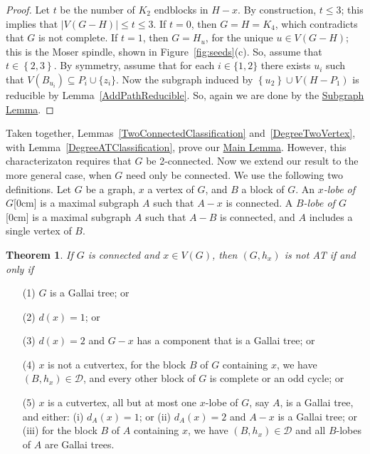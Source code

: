 \documentclass[12pt]{article}
\theoremstyle{plain}
\newtheorem{thm}{Theorem}[section]
\theoremstyle{definition}
\theoremstyle{remark}
\newcommand{\fancy}[1]{\mathcal{#1}}
\newcommand{\D}{\fancy{D}}
\newcommand{\set}[1]{\left\{ #1 \right\}}
\def\D{\fancy{D}}
\newcommand{\aside}[1]{\marginnote{\scriptsize{#1}}[0cm]}
\begin{document}
\begin{proof}
		Let $t$ be the number of $K_2$ endblocks in $H-x$.
		By construction, $t\le 3$; this implies that $|V(G - H)| \le t\le 3$.   
		If $t = 0$, then $G = H = K_4$, which contradicts that $G$ is not complete.  
		If $t=1$, then $G = H_u$, for the unique $u \in V(G-H)$; this is the Moser
		spindle, shown in Figure~\ref{fig:seeds}(c).  So, assume that $t \in
		\set{2,3}$.  By symmetry, assume that for each $i\in\{1,2\}$ there exists $u_i$
		such that $V(B_{u_i})\subseteq P_i\cup\{z_i\}$.  Now the subgraph induced by
		$\set{u_2}\cup V(H-P_1)$ is reducible by Lemma~\ref{AddPathReducible}. 
		So, again we are done by the \hyperlink{target:InducedSubgraph}{Subgraph Lemma}.  
	\end{proof}
	
	Taken together, Lemmas~\ref{TwoConnectedClassification}
	and~\ref{DegreeTwoVertex}, with
	Lemma~\ref{DegreeATClassification}, prove our \hyperlink{target:mainLemma}{Main Lemma}.
	However, this characterizaton requires that $G$ be 2-connected.
	Now we extend our result to the more general case, when $G$ need only be
	connected.  We use the following two definitions.  Let $G$ be a graph, $x$
	a vertex of $G$, and $B$ a block of $G$.  An \emph{$x$-lobe of
		$G$}\aside{$x$-lobe} is a maximal subgraph $A$ such that $A-x$ is connected.  A
	\emph{$B$-lobe of $G$}\aside{$B$-lobe} is a maximal subgraph $A$ such that
	$A-B$ is connected, and $A$ includes a single vertex of $B$.  
	
	\begin{thm}
		If $G$ is connected and $x \in V(G)$, then $(G, h_x)$ is not AT if and only if
		\label{thm:1connected}
	\end{thm}
	
	\begin{enumerate}
		\item[(1)] $G$ is a Gallai tree; or
		\item[(2)] $d(x) = 1$; or
		\item[(3)] $d(x) = 2$ and $G-x$ has a component that is a Gallai tree; or
		\item[(4)] $x$ is not a cutvertex, for the block $B$ of $G$ containing $x$,
		we have $(B,h_x) \in \D$, and every other block of $G$ is complete or
		an odd cycle; or
		\item[(5)]
		$x$ is a cutvertex, all but at most one $x$-lobe of $G$, say $A$, is a Gallai
		tree, and either:
		(i) $d_A(x) = 1$; or
		(ii) $d_A(x)=2$ and $A-x$ is a Gallai tree; or 
		(iii) for the block $B$ of $A$ containing $x$, 
		we have $(B,h_x)\in \D$ and all $B$-lobes of $A$ are Gallai trees. 
	\end{enumerate}
	
\end{document}
